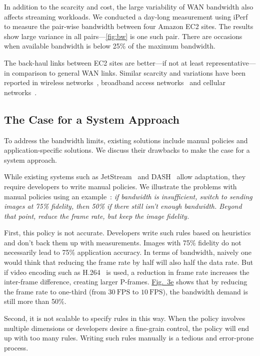 In addition to the scarcity and cost, the large variability of WAN bandwidth
also affects streaming workloads. We conducted a day-long measurement using
iPerf~\cite{iperf3} to measure the pair-wise bandwidth between four Amazon EC2
sites. The results show large variance in all pairs---\autoref{fig:bw} is one
such pair. There are occasions when available bandwidth is below 25\% of the
maximum bandwidth.

The back-haul links between EC2 sites are better---if not at least
representative---in comparison to general WAN links. Similar scarcity and
variations have been reported in wireless networks~\cite{biswas2015large},
broadband access networks~\cite{grover2013peeking, sundaresan2014bismark} and
cellular networks~\cite{nikravesh2014mobile}.

\subsection{The Case for a System Approach}
\label{sec:making-case-sys-approach}

To address the bandwidth limits, existing solutions include manual policies and
application-specific solutions. We discuss their drawbacks to make the case for
a system approach.

 While existing systems such as
JetStream~\cite{rabkin2014aggregation} and DASH~\cite{sodagar2011mpeg} allow
adaptation, they require developers to write manual policies. We illustrate the
problems with manual policies using an example~\cite{rabkin2014aggregation}: \textit{if bandwidth is insufficient,
  switch to sending images at 75\% fidelity, then 50\% if there still isn't
  enough bandwidth. Beyond that point, reduce the frame rate, but keep the image
  fidelity.}

First, this policy is not accurate.
Developers write such rules based on heuristics and
don't back them up with measurements. Images with 75\% fidelity do not
necessarily lead to 75\% application accuracy. In terms of bandwidth, naively
one would think that reducing the frame rate by half will also half the data
rate. But if video encoding such as H.264~\cite{richardson2011h} is used, a reduction in frame rate increases the inter-frame difference, creating
larger P-frames. \hyperref[fig:app-specific]{Fig.~3e} shows that by reducing the
frame rate to one-third (from \(30~\text{FPS}\) to \(10~\text{FPS}\)), the bandwidth demand is still more than 50\%.

Second, it is not scalable to specify rules in this way. When the policy involves multiple dimensions
or developers desire a fine-grain control, the policy will end up with too many
rules.  Writing such rules manually is a tedious and error-prone process.


